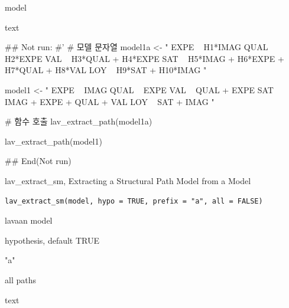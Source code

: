 \documentclass[a4paper]{book}
\begin{document}
%
\begin{Arguments}
\begin{ldescription}
\item[\code{model}] model
\end{ldescription}
\end{Arguments}
%
\begin{Value}
text
\end{Value}
%
\begin{Examples}
\begin{ExampleCode}

## Not run: 
#'
# 모델 문자열
model1a <- "
EXPE ~ H1*IMAG
QUAL ~ H2*EXPE
VAL ~ H3*QUAL + H4*EXPE
SAT ~ H5*IMAG + H6*EXPE + H7*QUAL + H8*VAL
LOY ~ H9*SAT + H10*IMAG
"

model1 <- "
EXPE ~ IMAG
QUAL ~ EXPE
VAL ~ QUAL + EXPE
SAT ~ IMAG + EXPE + QUAL + VAL
LOY ~ SAT + IMAG
"


# 함수 호출
lav_extract_path(model1a)

lav_extract_path(model1)


## End(Not run)


\end{ExampleCode}
\end{Examples}
%
\begin{Description}
lav\_extract\_sm, Extracting a Structural Path Model from a Model
\end{Description}
%
\begin{Usage}
\begin{verbatim}
lav_extract_sm(model, hypo = TRUE, prefix = "a", all = FALSE)
\end{verbatim}
\end{Usage}
%
\begin{Arguments}
\begin{ldescription}
\item[\code{model}] lavaan model

\item[\code{hypo}] hypothesis, default TRUE

\item[\code{prefix}] "a"

\item[\code{all}] all paths
\end{ldescription}
\end{Arguments}
%
\begin{Value}
text
\end{Value}
\end{document}

